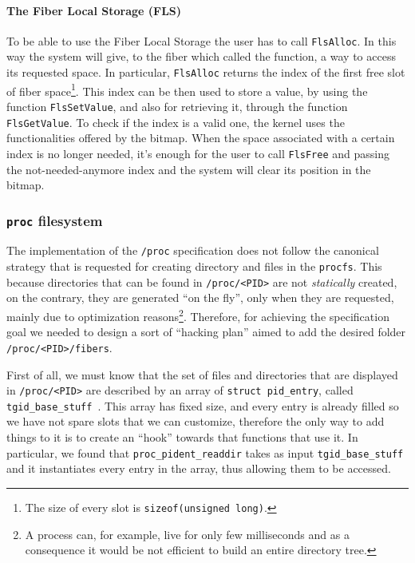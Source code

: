 \documentclass[a4paper,10pt]{article}
\begin{document}
  \paragraph{The Fiber Local Storage (FLS)}
    To be able to use the Fiber Local Storage the user has to call \lstinline{FlsAlloc}. In this way the system will give, to the fiber which called the function, a way to access its requested space. In particular, \lstinline{FlsAlloc} returns the index of the first free slot of fiber space\footnote{The size of every slot is \lstinline{sizeof(unsigned long)}.}. This index can be then used to store a value, by using the function \lstinline{FlsSetValue}, and also for retrieving it, through the function \lstinline{FlsGetValue}. To check if the index is a valid one, the kernel uses the functionalities offered by the bitmap. When the space associated with a certain index is no longer needed, it’s enough for the user to call \lstinline{FlsFree} and passing the not-needed-anymore index and the system will clear its position in the bitmap.

\subsubsection{\texttt{\/proc} filesystem}\label{subsubsec:kern-procfs}
  The implementation of the \texttt{/proc} specification does not follow the canonical strategy that is requested for creating directory and files in the \texttt{procfs}. This because directories that can be found in \lstinline{/proc/<PID>} are not \textit{statically} created, on the contrary, they are generated ``on the fly'', only when they are requested, mainly due to optimization reasons\footnote{A process can, for example, live for only few milliseconds and as a consequence it would be not efficient to build an entire directory tree.}. Therefore, for achieving the specification goal we needed to design a sort of ``hacking plan'' aimed to add the desired folder \lstinline{/proc/<PID>/fibers}.

  First of all, we must know that the set of files and directories that are displayed in \lstinline{/proc/<PID>} are described by an array of \lstinline{struct pid_entry}, called \lstinline{tgid_base_stuff}~\cite{kern_tgid_base_stuff}. This array has fixed size, and every entry is already filled so we have not spare slots that we can customize, therefore the only way to add things to it is to create an ``hook'' towards that functions that use it. In particular, we found that \lstinline{proc_pident_readdir} takes as input \lstinline{tgid_base_stuff} and it instantiates every entry in the array, thus allowing them to be accessed.
\end{document}
